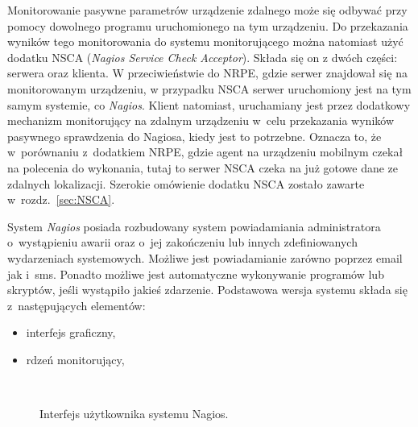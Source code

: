 Monitorowanie pasywne parametrów urządzenie zdalnego może się odbywać
przy pomocy dowolnego programu uruchomionego na tym urządzeniu. Do
przekazania wyników tego monitorowania do systemu monitorującego można
natomiast użyć dodatku NSCA ({\em Nagios Service Check
  Acceptor}). Składa się on z dwóch części: serwera oraz klienta. W
przeciwieństwie do NRPE, gdzie serwer znajdował się na monitorowanym
urządzeniu, w przypadku NSCA serwer uruchomiony jest na tym samym
systemie, co {\em Nagios}. Klient natomiast, uruchamiany jest przez
dodatkowy mechanizm monitorujący na zdalnym urządzeniu w~celu
przekazania wyników pasywnego sprawdzenia do Nagiosa, kiedy jest to
potrzebne. Oznacza to, że w~porównaniu z~dodatkiem NRPE, gdzie agent
na urządzeniu mobilnym czekał na polecenia do wykonania, tutaj to
serwer NSCA czeka na już gotowe dane ze zdalnych lokalizacji. Szerokie
omówienie dodatku NSCA zostało zawarte w~rozdz.~\ref{sec:NSCA}.

System {\em Nagios} posiada rozbudowany system powiadamiania administratora
o~wystąpieniu awarii oraz o~jej zakończeniu lub innych zdefiniowanych
wydarzeniach systemowych. Możliwe jest powiadamianie zarówno poprzez
email jak i~sms. Ponadto możliwe jest automatyczne wykonywanie
programów lub skryptów, jeśli wystąpiło jakieś zdarzenie. Podstawowa
wersja systemu składa się z~następujących elementów:

\begin{itemize}
\item interfejs graficzny,
\item rdzeń monitorujący,
\end{itemize}

\begin{figure}[h]
\label{fig:NagiosInterface}
\caption{Interfejs użytkownika systemu Nagios.}
\begin{center}
\\[0.1cm]
\end{center}
\end{figure}

